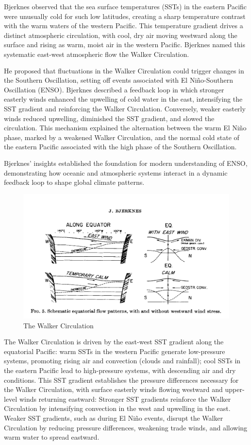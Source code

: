 Bjerknes observed that the sea surface temperatures (SSTs) in the eastern Pacific were unusually cold for such low latitudes, creating a sharp temperature contrast with the warm waters of the western Pacific. This temperature gradient drives a distinct atmospheric circulation, with cool, dry air moving westward along the surface and rising as warm, moist air in the western Pacific. Bjerknes named this systematic east-west atmospheric flow the Walker Circulation.

He proposed that fluctuations in the Walker Circulation could trigger changes in the Southern Oscillation, setting off events associated with El Niño-Southern Oscillation (ENSO). Bjerknes described a feedback loop in which stronger easterly winds enhanced the upwelling of cold water in the east, intensifying the SST gradient and reinforcing the Walker Circulation. Conversely, weaker easterly winds reduced upwelling, diminished the SST gradient, and slowed the circulation. This mechanism explained the alternation between the warm El Niño phase, marked by a weakened Walker Circulation, and the normal cold state of the eastern Pacific associated with the high phase of the Southern Oscillation.

Bjerknes’ insights established the foundation for modern understanding of ENSO, demonstrating how oceanic and atmospheric systems interact in a dynamic feedback loop to shape global climate patterns.
\begin{figure}[h!]
	\centering
	\includegraphics[width=0.5\linewidth]{uploads/Screenshot 2024-11-24 191635.png}
	\caption{The Walker Circulation}
	\label{fig:enter-label}
\end{figure}
The Walker Circulation is driven by the east-west SST gradient along the equatorial Pacific: warm SSTs in the western Pacific generate low-pressure systems, promoting rising air and convection (clouds and rainfall); cool SSTs in the eastern Pacific lead to high-pressure systems, with descending air and dry conditions.
This SST gradient establishes the pressure differences necessary for the Walker Circulation, with surface easterly winds flowing westward and upper-level winds returning eastward: Stronger SST gradients reinforce the Walker Circulation by intensifying convection in the west and upwelling in the east. Weaker SST gradients, such as during El Niño events, disrupt the Walker Circulation by reducing pressure differences, weakening trade winds, and allowing warm water to spread eastward.

